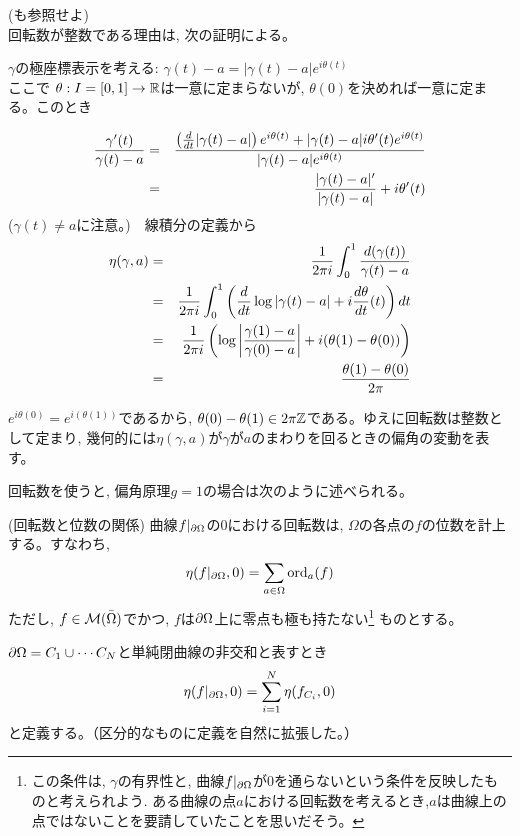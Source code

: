\begin{rem} (\cite[122～133p]{ahl}も参照せよ)\\
回転数が整数である理由は, 次の証明による。

$\gamma$の極座標表示を考える: $\gamma(t)-a=|\gamma(t)-a|e^{i\theta(t)}$\\
ここで $\theta: I=[0,1]\to \mathbb{R}$は一意に定まらないが, $\theta(0)$を決めれば一意に定まる。このとき

\begin{eqnarray*}
\dfrac{\gamma'(t)}{\gamma(t)-a}&=&\dfrac{\left( \frac{d}{dt}|\gamma(t)-a| \right)e^{i\theta(t)}+|\gamma(t)-a|i\theta'(t)e^{i\theta(t)} }{|\gamma(t)-a|e^{i\theta(t)}}\\
&=&\dfrac{|\gamma(t)-a|'}{|\gamma(t)-a|} +i\theta'(t)
\end{eqnarray*}
($\gamma(t)\neq a$に注意。)　線積分の定義から
\begin{eqnarray*}
\eta(\gamma, a)&=& \dfrac{1}{2\pi i}\displaystyle\int_{0}^{1} \dfrac{d(\gamma(t))}{\gamma(t) - a} \\
&=&\dfrac{1}{2\pi i} \displaystyle\int_{0}^{1}\left(\dfrac{d}{dt}\log{|\gamma(t)-a|}+i\dfrac{d\theta}{dt}(t)\right)dt \\
&=&\dfrac{1}{2\pi i}\left(\log{\left|\dfrac{\gamma(1) -a}{\gamma(0) -a}\right|} +i(\theta(1)-\theta(0))\right) \\
&=& \dfrac{\theta(1)-\theta(0)}{2\pi}
\end{eqnarray*}

$e^{i\theta(0)}=e^{i(\theta(1))}$であるから, $ \theta(0) - \theta(1) \in 2\pi \mathbb{Z}$である。ゆえに回転数は整数として定まり, 幾何的には$\eta(\gamma, a)$が$\gamma$が$a$のまわりを回るときの偏角の変動を表す。\bbox
\end{rem}

回転数を使うと, 偏角原理$g=1$の場合は次のように述べられる。

\begin{recall} (回転数と位数の関係) \label{recall:kaiten}
曲線$f|_{\partial\Omega}$の$0$における回転数は, $\Omega$の各点の$f$の位数を計上する。すなわち,
\[\eta(f|_{\partial\Omega}, 0)=\displaystyle\sum_{a\in \Omega} \mbox{ord}_a(f)\]
ただし, $f\in \mathcal{M}(\bar{\Omega})$でかつ, $f$は$\partial\Omega$上に零点も極も持たない\footnote{この条件は, $\gamma$の有界性と, 曲線$f|_{\partial\Omega}$が$0$を通らないという条件を反映したものと考えられよう. ある曲線の点$a$における回転数を考えるとき,$a$は曲線上の点ではないことを要請していたことを思いだそう。} ものとする。\bbox
\end{recall}
\begin{rem}
$\partial\Omega =C_1\cup \cdots C_N$と単純閉曲線の非交和と表すとき
\[\eta(f|_{\partial\Omega}, 0)=\displaystyle\sum_{i=1}^{N}\eta(f_{C_i},0)\]
と定義する。（区分的なものに定義を自然に拡張した。）
\end{rem}


